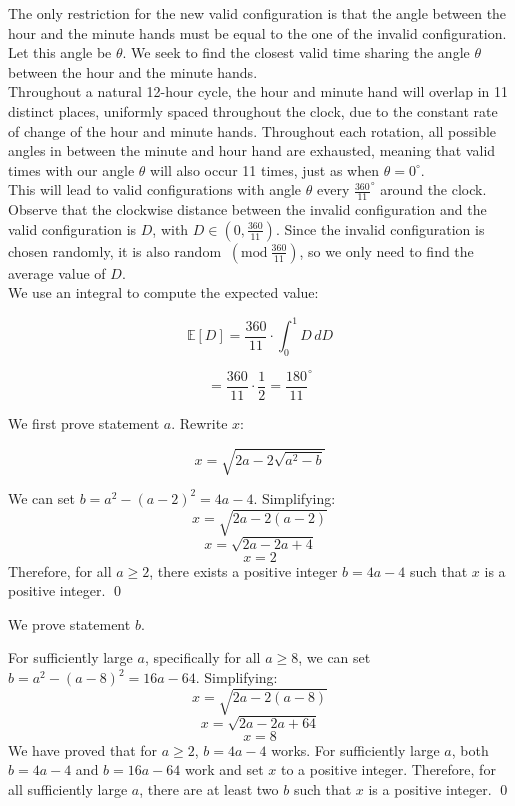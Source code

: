 \documentclass[11pt, letterpaper]{article}
\newcommand{\Mod}[1]{\ (\mathrm{mod}\ #1)}
\begin{document}
\begin{solution}{2}

The only restriction for the new valid configuration is that the angle between the hour and the minute hands must be equal to the one of the invalid configuration. Let this angle be $\theta$. We seek to find the closest valid time sharing the angle $\theta$ between the hour and the minute hands.\\

Throughout a natural 12-hour cycle, the hour and minute hand will overlap in 11 distinct places, uniformly spaced throughout the clock, due to the constant rate of change of the hour and minute hands. Throughout each rotation, all possible angles in between the minute and hour hand are exhausted, meaning that valid times with our angle $\theta$ will also occur 11 times, just as when $\theta = 0^{\circ}$. \\

This will lead to valid configurations with angle $\theta$ every $\frac{360}{11}^{\circ}$ around the clock. Observe that the clockwise distance between the invalid configuration and the valid configuration is $D$, with $D\in(0,\frac{360}{11})$. Since the invalid configuration is chosen randomly, it is also random $\Mod{\frac{360}{11}}$, so we only need to find the average value of $D$.\\

We use an integral to compute the expected value:

$$\mathbb{E}[D] = \frac{360}{11}\cdot\int_{0}^{1} D \,dD$$


$$=\frac{360}{11}\cdot\frac{1}{2} = \boxed{\frac{180}{11}^\circ}$$


\end{solution}

\begin{solution}{3}

We first prove statement $a$. Rewrite $x$:

$$x = \sqrt{2a-2\sqrt{a^2 - b}}$$

We can set $b = a^2 - (a-2)^2 = 4a-4$. Simplifying:$$x=\sqrt{2a-2(a-2)}$$ $$x=\sqrt{2a-2a + 4}$$ $$x=2$$ Therefore, for all $a\geq2$, there exists a positive integer $b=4a-4$ such that $x$ is a positive integer. \qed

We prove statement $b$. 

For sufficiently large $a$, specifically for all $a \geq 8$, we can set $b = a^2 - (a-8)^2 = 16a - 64$. Simplifying: $$x = \sqrt{2a-2(a-8)}$$ $$x = \sqrt{2a - 2a + 64}$$ $$x = 8$$ We have proved that for $a\geq2$, $b = 4a-4$ works. For sufficiently large $a$, both $b = 4a-4$ and $b = 16a-64$ work and set $x$ to a positive integer. Therefore, for all sufficiently large $a$, there are at least two $b$ such that $x$ is a positive integer. \qed



\end{solution}
\end{document}

